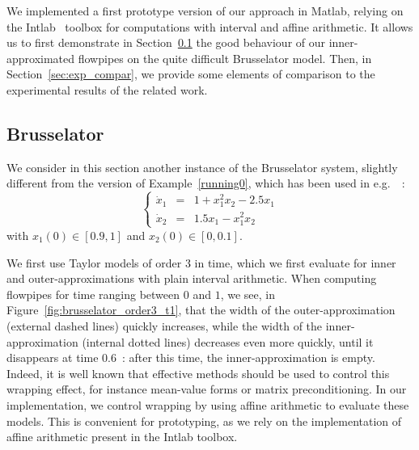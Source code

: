 We implemented a first prototype version of our approach in Matlab, relying on the Intlab~\cite{Ru99a} 
toolbox for computations with interval and affine arithmetic.
It allows us to first demonstrate in Section~\ref{sec:exp_bruss} the good behaviour of our inner-approximated flowpipes
 on the quite difficult Brusselator model. %
Then, in Section~\ref{sec:exp_compar}, we provide some elements of comparison to the experimental results 
of the related work. 
 
\subsection{Brusselator}
\label{sec:exp_bruss}

We consider in this section another instance of the Brusselator system, slightly different  from the version of  Example~\ref{running0}, 
which has been used in e.g.~\cite{Underapproxflowpipes,underapprox16}~: 
$$\left\{\begin{array}{rcl}
\dot{x}_1 & = & 1+x_1^2x_2-2.5x_1 \\
\dot{x}_2 & = & 1.5x_1-x_1^2x_2
\end{array}\right.$$
\noindent with $x_1(0) \in [0.9,1]$ and $x_2(0) \in [0,0.1]$.

We first use Taylor models of order 3 in time, which we first evaluate for inner and outer-approximations 
with plain interval arithmetic. When computing flowpipes for time ranging between $0$ and $1$, 
we see, in Figure~\ref{fig:brusselator_order3_t1}, that the width of the outer-approximation 
(external dashed lines) quickly increases, while the 
width of the inner-approximation (internal dotted lines) decreases even more quickly, 
until it disappears at time 0.6~: after this time, the inner-approximation is empty. Indeed, it is well 
known that effective methods should be used to control this wrapping effect, for instance mean-value 
forms or matrix preconditioning. In our implementation, we control wrapping by using 
affine arithmetic to evaluate these models. %
This is convenient for prototyping, 
as we rely on the implementation of affine arithmetic present in the Intlab 
toolbox.
 
